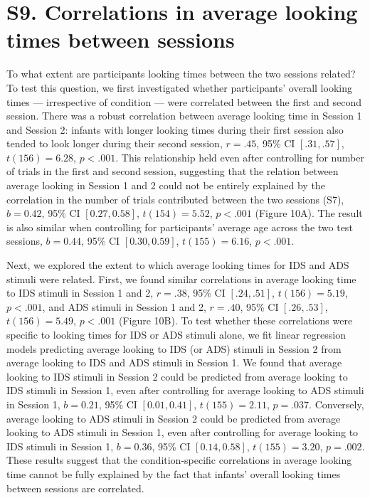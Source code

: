 \documentclass[
  man, donotrepeattitle,floatsintext]{apa6}
\begin{document}
\newpage

\hypertarget{s9.-correlations-in-average-looking-times-between-sessions}{%
\section{S9. Correlations in average looking times between sessions}\label{s9.-correlations-in-average-looking-times-between-sessions}}

To what extent are participants looking times between the two sessions related?
To test this question, we first investigated whether participants' overall looking times --- irrespective of condition --- were correlated between the first and second session.
There was a robust correlation between average looking time in Session 1 and Session 2: infants with longer looking times during their first session also tended to look longer during their second session, \(r = .45\), 95\% CI \([.31, .57]\), \(t(156) = 6.28\), \(p < .001\).
This relationship held even after controlling for number of trials in the first and second session, suggesting that the relation between average looking in Session 1 and 2 could not be entirely explained by the correlation in the number of trials contributed between the two sessions (S7), \(b = 0.42\), 95\% CI \([0.27, 0.58]\), \(t(154) = 5.52\), \(p < .001\) (Figure 10A).
The result is also similar when controlling for participants' average age across the two test sessions, \(b = 0.44\), 95\% CI \([0.30, 0.59]\), \(t(155) = 6.16\), \(p < .001\).

Next, we explored the extent to which average looking times for IDS and ADS stimuli were related.
First, we found similar correlations in average looking time to IDS stimuli in Session 1 and 2, \(r = .38\), 95\% CI \([.24, .51]\), \(t(156) = 5.19\), \(p < .001\), and ADS stimuli in Session 1 and 2, \(r = .40\), 95\% CI \([.26, .53]\), \(t(156) = 5.49\), \(p < .001\) (Figure 10B).
To test whether these correlations were specific to looking times for IDS or ADS stimuli alone, we fit linear regression models predicting average looking to IDS (or ADS) stimuli in Session 2 from average looking to IDS and ADS stimuli in Session 1.
We found that average looking to IDS stimuli in Session 2 could be predicted from average looking to IDS stimuli in Session 1, even after controlling for average looking to ADS stimuli in Session 1, \(b = 0.21\), 95\% CI \([0.01, 0.41]\), \(t(155) = 2.11\), \(p = .037\).
Conversely, average looking to ADS stimuli in Session 2 could be predicted from average looking to ADS stimuli in Session 1, even after controlling for average looking to IDS stimuli in Session 1, \(b = 0.36\), 95\% CI \([0.14, 0.58]\), \(t(155) = 3.20\), \(p = .002\).
These results suggest that the condition-specific correlations in average looking time cannot be fully explained by the fact that infants' overall looking times between sessions are correlated.
\end{document}
